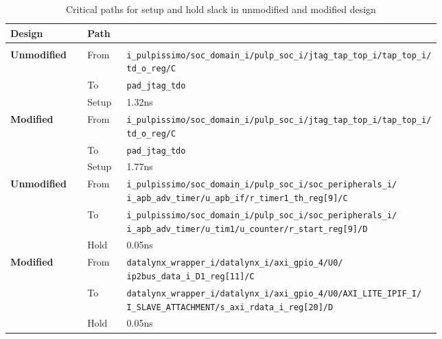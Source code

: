 \documentclass[../bachelor_paper.tex]{subfiles}
\begin{document}
\begin{table}
    \centering
    \begin{tabular}{llp{0.73\linewidth}}
    \textbf{Design} & \textbf{Path} \\
    \hline\\[-0.9em]
    \textbf{Unmodified} & From  & \texttt{i\_pulpissimo/soc\_domain\_i/pulp\_soc\_i/jtag\_tap\_top\_i/tap\_top\_i/ td\_o\_reg/C} \\
                        & To    & \texttt{pad\_jtag\_tdo} \\
                        & Setup & 1.32ns \\
    \textbf{Modified}   & From  & \texttt{i\_pulpissimo/soc\_domain\_i/pulp\_soc\_i/jtag\_tap\_top\_i/tap\_top\_i/ td\_o\_reg/C} \\ 
                        & To    & \texttt{pad\_jtag\_tdo} \\
                        & Setup & 1.77ns \\
    \textbf{Unmodified} & From  & \texttt{i\_pulpissimo/soc\_domain\_i/pulp\_soc\_i/soc\_peripherals\_i/ i\_apb\_adv\_timer/u\_apb\_if/r\_timer1\_th\_reg[9]/C} \\
                        & To    & \texttt{i\_pulpissimo/soc\_domain\_i/pulp\_soc\_i/soc\_peripherals\_i/ i\_apb\_adv\_timer/u\_tim1/u\_counter/r\_start\_reg[9]/D} \\
                        & Hold  & 0.05ns \\
    \textbf{Modified}   & From  & \texttt{datalynx\_wrapper\_i/datalynx\_i/axi\_gpio\_4/U0/ ip2bus\_data\_i\_D1\_reg[11]/C} \\
                        & To    & \texttt{datalynx\_wrapper\_i/datalynx\_i/axi\_gpio\_4/U0/AXI\_LITE\_IPIF\_I/ I\_SLAVE\_ATTACHMENT/s\_axi\_rdata\_i\_reg[20]/D} \\
                        & Hold  & 0.05ns \\
    \hline
    \end{tabular}
    \caption{Critical paths for setup and hold slack in unmodified and modified design}
    \label{tab:perf/timing/crit}
\end{table}
\end{document}
